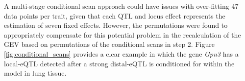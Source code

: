 \documentclass[9pt,twocolumn,twoside]{gsajnl}
\begin{document}
A multi-stage conditional scan approach could have issues with over-fitting 47 data points per trait, given that each $\text{QTL}$ and $\text{locus}$ effect represents the estimation of seven fixed effects. However, the permutations were found to appropriately compensate for this potential problem in the recalculation of the GEV based on permutations of the conditional scans in step 2. Figure \ref{fig:conditional_scans} provides a clear example in which the gene \textit{Gpn3} has a local-eQTL detected after a strong distal-eQTL is conditioned for within the model in lung tissue. 




\end{document}
